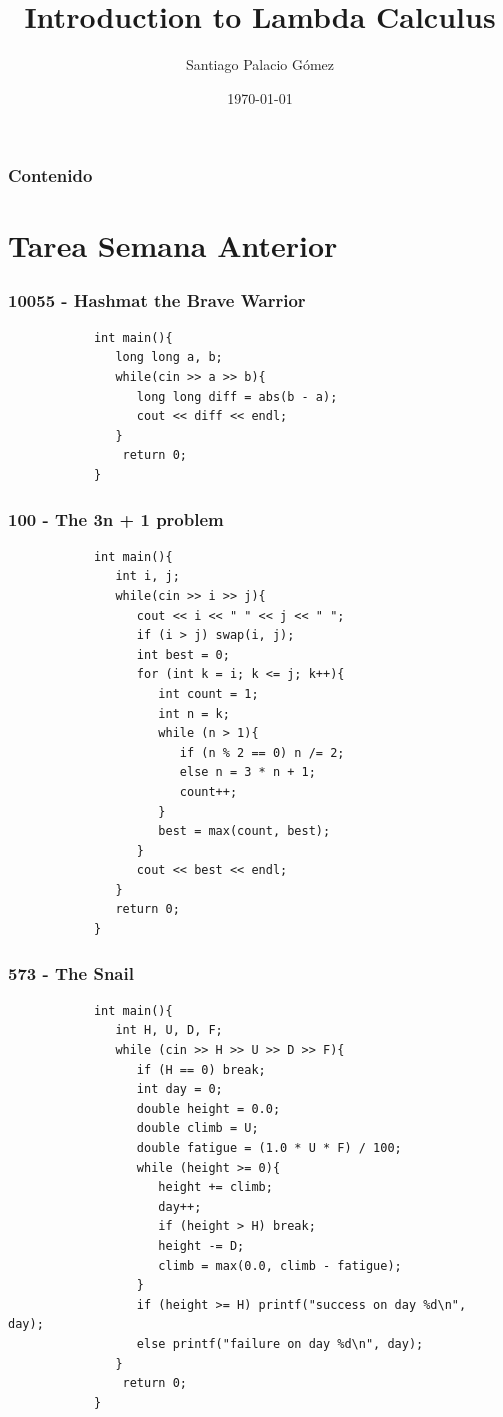 \documentclass{beamer}
\title{Introduction to Lambda Calculus}
\author{Santiago Palacio Gómez}
\institute{Universidad EAFIT}
\date{\today}
\begin{document}
\begin{frame}
	\titlepage
\end{frame}

\begin{frame}
	\frametitle{Contenido}
	\tableofcontents
\end{frame}

\section{Tarea Semana Anterior}
	\begin{frame}[fragile]
		\frametitle{10055 - Hashmat the Brave Warrior}
		\begin{lstlisting}
			int main(){
			   long long a, b;
			   while(cin >> a >> b){
			      long long diff = abs(b - a);
			      cout << diff << endl;
			   }
			    return 0;
			}
		\end{lstlisting}
	\end{frame}

	\begin{frame}[fragile]
		\frametitle{100 - The 3n + 1 problem}
		\begin{lstlisting}
			int main(){
			   int i, j;
			   while(cin >> i >> j){
			      cout << i << " " << j << " ";
			      if (i > j) swap(i, j);
			      int best = 0;
			      for (int k = i; k <= j; k++){
			         int count = 1;
			         int n = k;
			         while (n > 1){
			            if (n % 2 == 0) n /= 2;
			            else n = 3 * n + 1;
			            count++;
			         }
			         best = max(count, best);
			      }
			      cout << best << endl;
			   }   
			   return 0;
			}
		\end{lstlisting}
	\end{frame}

	\begin{frame}[fragile]
		\frametitle{573 - The Snail}
		\begin{lstlisting}
			int main(){
			   int H, U, D, F;
			   while (cin >> H >> U >> D >> F){
			      if (H == 0) break;
			      int day = 0;
			      double height = 0.0;
			      double climb = U;
			      double fatigue = (1.0 * U * F) / 100;
			      while (height >= 0){
			         height += climb;
			         day++;
			         if (height > H) break;
			         height -= D;
			         climb = max(0.0, climb - fatigue);
			      }
			      if (height >= H) printf("success on day %d\n",
day);
			      else printf("failure on day %d\n", day);
			   }
			    return 0;
			}
		\end{lstlisting}
	\end{frame}
\end{document}
